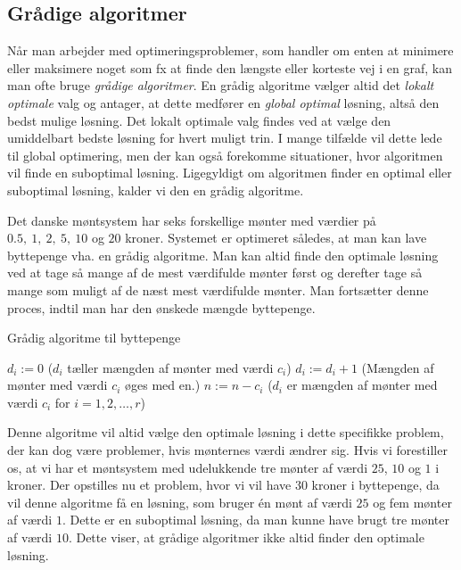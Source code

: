 \subsection{Grådige algoritmer}
Når man arbejder med optimeringsproblemer, som handler om enten at minimere eller maksimere noget som fx at finde den længste eller korteste vej i en graf, kan man ofte bruge \emph{grådige algoritmer}.
En grådig algoritme vælger altid det \emph{lokalt optimale} valg og antager, at dette medfører en \emph{global optimal} løsning, altså den bedst mulige løsning. Det lokalt optimale valg findes ved at vælge den umiddelbart bedste løsning for hvert muligt trin.
I mange tilfælde vil dette lede til global optimering, men der kan også forekomme situationer, hvor algoritmen vil finde en suboptimal løsning. Ligegyldigt om algoritmen finder en optimal eller suboptimal løsning, kalder vi den en grådig algoritme.

\begin{exmp}
Det danske møntsystem har seks forskellige mønter med værdier på $0.5,\ 1,\ 2,\ 5,\ 10$ og $20$ kroner. Systemet er optimeret således, at man kan lave byttepenge vha. en grådig algoritme. Man kan altid finde den optimale løsning ved at tage så mange af de mest værdifulde mønter først og derefter tage så mange som muligt af de næst mest værdifulde mønter. Man fortsætter denne proces, indtil man har den ønskede mængde byttepenge.
\begin{algorithm} [H]
\caption{Grådig algoritme til byttepenge}
\begin{algorithmic}[1]

\EndProcedure
{}
    \State $d_i:=0$ ($d_i$ tæller mængden af mønter med værdi $c_i$)
    	\State $d_i := d_i+1$ (Mængden af mønter med værdi $c_i$ øges med en.)
    	\State $n := n-c_i$
\EndWhile
\EndFor
\State ($d_i$ er mængden af mønter med værdi $c_i$ for $i=1,2,\dotsc,r$)
\end{algorithmic}
\end{algorithm}
Denne algoritme vil altid vælge den optimale løsning i dette specifikke problem, der kan dog være problemer, hvis mønternes værdi ændrer sig. 
Hvis vi forestiller os, at vi har et møntsystem med udelukkende tre mønter af værdi $25$, $10$ og $1$ i kroner. Der opstilles nu et problem, hvor vi vil have $30$ kroner i byttepenge, da vil denne algoritme få en løsning, som bruger én mønt af værdi $25$ og fem mønter af værdi $1$. Dette er en suboptimal løsning, da man kunne have brugt tre mønter af værdi $10$.
Dette viser, at grådige algoritmer ikke altid finder den optimale løsning.
\end{exmp}

